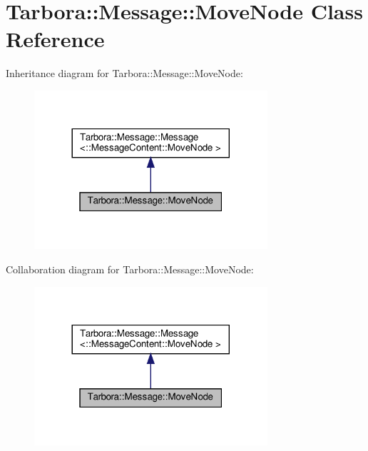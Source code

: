 \hypertarget{classTarbora_1_1Message_1_1MoveNode}{}\section{Tarbora\+:\+:Message\+:\+:Move\+Node Class Reference}
\label{classTarbora_1_1Message_1_1MoveNode}


Inheritance diagram for Tarbora\+:\+:Message\+:\+:Move\+Node\+:\nopagebreak
\begin{figure}[H]
\begin{center}
\leavevmode
\includegraphics[width=245pt]{classTarbora_1_1Message_1_1MoveNode__inherit__graph}
\end{center}
\end{figure}


Collaboration diagram for Tarbora\+:\+:Message\+:\+:Move\+Node\+:\nopagebreak
\begin{figure}[H]
\begin{center}
\leavevmode
\includegraphics[width=245pt]{classTarbora_1_1Message_1_1MoveNode__coll__graph}
\end{center}
\end{figure}
